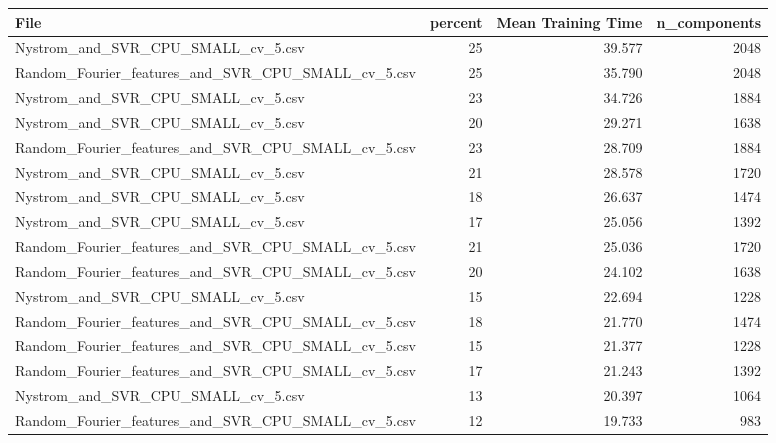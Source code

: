 \begin{tabularx}{\textwidth}{lrrr}
\toprule
                                              File &  percent &  Mean Training Time &  n\_components \\
\midrule
                Nystrom\_and\_SVR\_CPU\_SMALL\_cv\_5.csv &       25 &              39.577 &          2048 \\
Random\_Fourier\_features\_and\_SVR\_CPU\_SMALL\_cv\_5.csv &       25 &              35.790 &          2048 \\
                Nystrom\_and\_SVR\_CPU\_SMALL\_cv\_5.csv &       23 &              34.726 &          1884 \\
                Nystrom\_and\_SVR\_CPU\_SMALL\_cv\_5.csv &       20 &              29.271 &          1638 \\
Random\_Fourier\_features\_and\_SVR\_CPU\_SMALL\_cv\_5.csv &       23 &              28.709 &          1884 \\
                Nystrom\_and\_SVR\_CPU\_SMALL\_cv\_5.csv &       21 &              28.578 &          1720 \\
                Nystrom\_and\_SVR\_CPU\_SMALL\_cv\_5.csv &       18 &              26.637 &          1474 \\
                Nystrom\_and\_SVR\_CPU\_SMALL\_cv\_5.csv &       17 &              25.056 &          1392 \\
Random\_Fourier\_features\_and\_SVR\_CPU\_SMALL\_cv\_5.csv &       21 &              25.036 &          1720 \\
Random\_Fourier\_features\_and\_SVR\_CPU\_SMALL\_cv\_5.csv &       20 &              24.102 &          1638 \\
                Nystrom\_and\_SVR\_CPU\_SMALL\_cv\_5.csv &       15 &              22.694 &          1228 \\
Random\_Fourier\_features\_and\_SVR\_CPU\_SMALL\_cv\_5.csv &       18 &              21.770 &          1474 \\
Random\_Fourier\_features\_and\_SVR\_CPU\_SMALL\_cv\_5.csv &       15 &              21.377 &          1228 \\
Random\_Fourier\_features\_and\_SVR\_CPU\_SMALL\_cv\_5.csv &       17 &              21.243 &          1392 \\
                Nystrom\_and\_SVR\_CPU\_SMALL\_cv\_5.csv &       13 &              20.397 &          1064 \\
Random\_Fourier\_features\_and\_SVR\_CPU\_SMALL\_cv\_5.csv &       12 &              19.733 &           983 \\

\end{tabularx}
